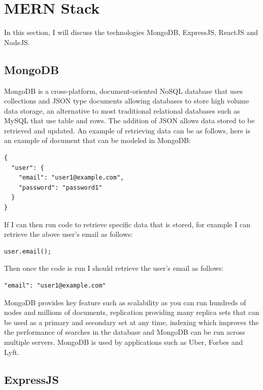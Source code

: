 \section{MERN Stack}

In this section, I will discuss the technologies MongoDB, ExpressJS, ReactJS and NodeJS.

\subsection{MongoDB}

MongoDB is a cross-platform, document-oriented NoSQL database that uses collections and JSON type documents allowing databases to store high volume data storage, an alternative to most traditional relational databases such as MySQL that use table and rows. The addition of JSON allows data stored to be retrieved and updated. An example of retrieving data can be as follows, here is an example of document that can be modeled in MongoDB:
\begin{verbatim}
{
  "user": {
    "email": "user1@example.com",
    "password": "password1"
  }
}
\end{verbatim}
If I can then run code to retrieve specific data that is stored, for example I can retrieve the above user's email as follows:
\begin{verbatim}
user.email();
\end{verbatim}
Then once the code is run I should retrieve the user's email as follows:
\begin{verbatim}
"email": "user1@example.com"
\end{verbatim}
MongoDB provides key feature such as scalability as you can run hundreds of nodes and millions of documents, replication providing many replica sets that can be used as a primary and secondary set at any time, indexing which improves the  the performance of searches in the database and MongoDB can be run across multiple servers. MongoDB is used by applications such as Uber, Forbes and Lyft.
\subsection{ExpressJS}

